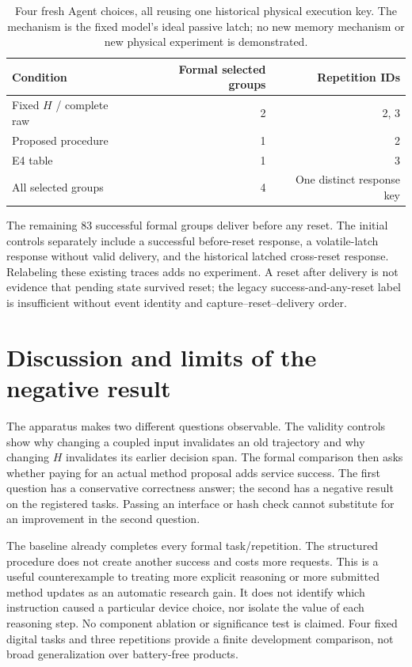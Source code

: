 \begin{table}[htbp]
\centering
\begin{tabular}{@{}lrr@{}}
\toprule
Condition & Formal selected groups & Repetition IDs \\
\midrule
Fixed $H$ / complete raw & 2 & 2, 3 \\
Proposed procedure & 1 & 2 \\
E4 table & 1 & 3 \\
\midrule
All selected groups & 4 & One distinct response key \\
\bottomrule
\end{tabular}
\caption{Four fresh Agent choices, all reusing one historical physical execution
key. The mechanism is the fixed model's ideal passive latch; no new memory
mechanism or new physical experiment is demonstrated.}
\label{tab:ordered}
\end{table}

The remaining 83 successful formal groups deliver before any reset. The
initial controls separately include a successful before-reset response, a
volatile-latch response without valid delivery, and the historical latched
cross-reset response. Relabeling these existing traces adds no experiment.
A reset after delivery is not evidence that pending state survived reset;
the legacy success-and-any-reset label is insufficient without event identity
and capture--reset--delivery order.

\section{Discussion and limits of the negative result}
The apparatus makes two different questions observable. The validity controls
show why changing a coupled input invalidates an old trajectory and why
changing $H$ invalidates its earlier decision span. The formal comparison then
asks whether paying for an actual method proposal adds service success. The
first question has a conservative correctness answer; the second has a
negative result on the registered tasks. Passing an interface or hash check
cannot substitute for an improvement in the second question.

The baseline already completes every formal task/repetition. The structured
procedure does not create another success and costs more requests. This is a
useful counterexample to treating more explicit reasoning or more submitted
method updates as an automatic research gain. It does not identify which
instruction caused a particular device choice, nor isolate the value of each
reasoning step. No component ablation or significance test is claimed. Four
fixed digital tasks and three repetitions provide a finite development
comparison, not broad generalization over battery-free products.

